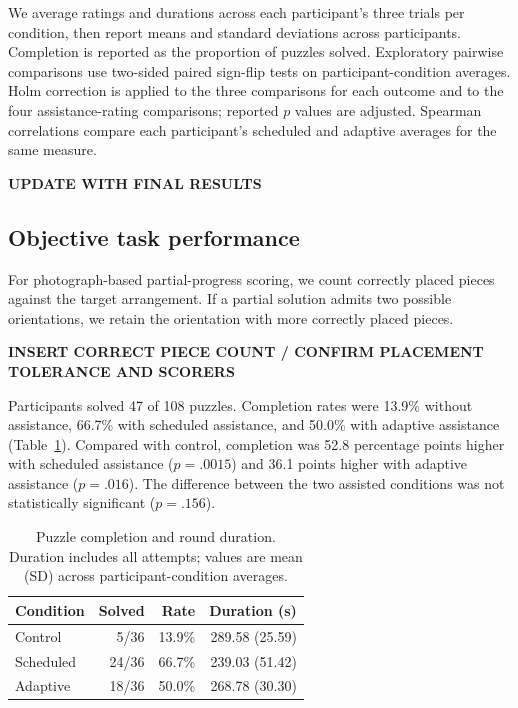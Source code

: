 \documentclass[sigconf,anonymous]{aamas}
\begin{document}
We average ratings and durations across each participant's three trials per condition, then report means and standard deviations across participants. Completion is reported as the proportion of puzzles solved. Exploratory pairwise comparisons use two-sided paired sign-flip tests on participant-condition averages. Holm correction is applied to the three comparisons for each outcome and to the four assistance-rating comparisons; reported $p$ values are adjusted. Spearman correlations compare each participant’s scheduled and adaptive averages for the same measure.

\textbf{UPDATE WITH FINAL RESULTS}

\subsection{Objective task performance}

For photograph-based partial-progress scoring, we count correctly placed pieces against the target arrangement. If a partial solution admits two possible orientations, we retain the orientation with more correctly placed pieces.

\textbf{INSERT CORRECT PIECE COUNT / CONFIRM PLACEMENT TOLERANCE AND SCORERS}

Participants solved 47 of 108 puzzles. Completion rates were 13.9\% without assistance, 66.7\% with scheduled assistance, and 50.0\% with adaptive assistance (Table~\ref{tab:performance}). Compared with control, completion was 52.8 percentage points higher with scheduled assistance ($p=.0015$) and 36.1 points higher with adaptive assistance ($p=.016$). The difference between the two assisted conditions was not statistically significant ($p=.156$).

\begin{table}[t]
\centering
\caption{Puzzle completion and round duration. Duration includes all attempts; values are mean (SD) across participant-condition averages.}
\label{tab:performance}
\begin{tabular}{lrrr}
\toprule
Condition & Solved & Rate & Duration (s) \\
\midrule
Control & 5/36 & 13.9\% & 289.58 (25.59) \\
Scheduled & 24/36 & 66.7\% & 239.03 (51.42) \\
Adaptive & 18/36 & 50.0\% & 268.78 (30.30) \\
\bottomrule
\end{tabular}
\end{table}
\end{document}
